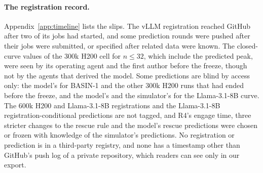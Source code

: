 \paragraph{The registration record.} Appendix~\ref{app:timeline} lists the slips. The vLLM registration reached GitHub after two of its jobs had started, and some prediction rounds were pushed after their jobs were submitted, or specified after related data were known. The closed-curve values of the 300k H200 cell for $n\le32$, which include the predicted peak, were seen by its operating agent and the first author before the freeze, though not by the agents that derived the model. Some predictions are blind by access only: the model's for BASIN-1 and the other 300k H200 runs that had ended before the freeze, and the model's and the simulator's for the Llama-3.1-8B curve. The 600k H200 and Llama-3.1-8B registrations and the Llama-3.1-8B registration-conditional predictions are not tagged, and R4's engage time, three stricter changes to the rescue rule and the model's rescue predictions were chosen or frozen with knowledge of the simulator's predictions. No registration or prediction is in a third-party registry, and none has a timestamp other than GitHub's push log of a private repository, which readers can see only in our export.
